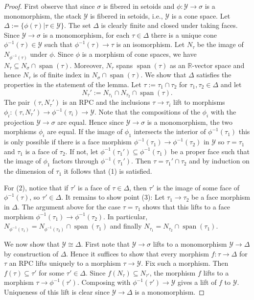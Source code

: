 \documentclass[11pt]{amsart}
\theoremstyle{definition}
\theoremstyle{remark}
\DeclareMathOperator{\Span}{span}
\begin{document}
\begin{proof}
	First observe that since $\sigma$ is fibered in setoids and $\phi:\mathcal{Y}\to \sigma$ is a monomorphism, the stack $\mathcal{Y}$
	is fibered in setoids, i.e., $\mathcal{Y}$ is a cone space. Let $\Delta:=\{\phi(\tau)|\tau\in \mathcal{Y}\}$. The set $\Delta$
	is clearly finite and closed under taking faces. Since
	$\mathcal{Y}\to \sigma$ is a monomorphism, for each $\tau\in \Delta$ there is a unique cone $\phi^{-1}(\tau)\in \mathcal{Y}$
	such that $\phi^{-1}(\tau)\to \tau$ is an isomorphism.
	Let $N_{\tau}$ be the image of $N_{\phi^{-1}(\tau)}$ under $\phi$. Since $\phi$ is a morphism of cone spaces, we have
	$N_{\tau}\subseteq N_{\sigma}\cap \Span(\tau)$. Moreover, $N_{\tau}$ spans $\Span(\tau)$ as an $\mathbb{R}$-vector space
	and hence $N_{\tau}$ is of finite index in $N_{\sigma}\cap \Span(\tau)$. We show that $\Delta$ satisfies the properties in
	the statement of the lemma. Let $\tau:=\tau_1\cap \tau_2$ for $\tau_1,\tau_2\in \Delta$ and let
	$$N_{\tau}':=N_{\tau_1}\cap N_{\tau_2}\cap \Span(\tau).$$
	The pair $(\tau,N_{\tau}')$ is an RPC and the inclusions $\tau\to \tau_i$ lift to morphisms
	$\phi_i:(\tau,N_{\tau}')\to \phi^{-1}(\tau_i)\to \mathcal{Y}$. Note that the compositions of the $\phi_i$ with
	the projection $\mathcal{Y}\to \sigma$ are equal. Hence since $\mathcal{Y}\to \sigma$ is a monomorphism, the two morphisms
	$\phi_i$ are equal. If the image of $\phi_1$ intersects the interior of $\phi^{-1}(\tau_1)$ this is only possible if there is a face
	morphism $\phi^{-1}(\tau_1)\to \phi^{-1}(\tau_2)$ in $\mathcal{Y}$ so $\tau=\tau_1$ and $\tau_1$ is a face of $\tau_2$. If not,
	let $\phi^{-1}(\tau_1')\subseteq \phi^{-1}(\tau_1)$ be a proper face such that the image of $\phi_1$ factors through $\phi^{-1}(\tau_1')$.
	Then $\tau=\tau_1'\cap \tau_2$ and by induction on the dimension of $\tau_1$ it follows that (1) is satisfied.

	For (2), notice that if $\tau'$ is a face of $\tau\in \Delta$, then $\tau'$ is the image of some face of $\phi^{-1}(\tau)$,
	so $\tau'\in \Delta$. It remains to show point (3): Let $\tau_1\to \tau_2$ be a face morphism in $\Delta$. The argument
	above for the case $\tau=\tau_1$ shows that this lifts to a face morphism $\phi^{-1}(\tau_1)\to \phi^{-1}(\tau_2)$. In particular,
	$N_{\phi^{-1}(\tau_1)}=N_{\phi^{-1}(\tau_2)}\cap \Span(\tau_1)$ and finally $N_{\tau_1}=N_{\tau_2}\cap \Span(\tau_1)$.

	We now show that $\mathcal{Y}\cong \Delta$. First note that $\mathcal{Y}\to \sigma$ lifts to a monomorphism $\mathcal{Y}\to \Delta$
	by construction of $\Delta$. Hence it suffices to show that every morphism $f:\tau\to \Delta$ for $\tau$ an RPC lifts uniquely to
	a morphism $\tau\to \mathcal{Y}$. Fix such a morphism. Then $f(\tau)\subseteq \tau'$ for some $\tau'\in \Delta$. Since $f(N_{\tau})\subseteq N_{\tau'}$,
	the morphism $f$ lifts to a morphism $\tau\to \phi^{-1}(\tau')$. Composing with $\phi^{-1}(\tau')\to \mathcal{Y}$ gives a lift
	of $f$ to $\mathcal{Y}$. Uniqueness of this lift is clear since $\mathcal{Y}\to \Delta$ is a monomorphism.
\end{proof}
\end{document}
